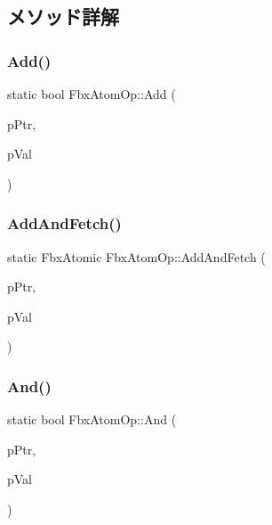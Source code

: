 \subsection{メソッド詳解}
\mbox{\label{class_fbx_atom_op_aa542a502e1881026c6936deb39c9641e}} 
\subsubsection{\texorpdfstring{Add()}{Add()}}
{\footnotesize\ttfamily static bool Fbx\+Atom\+Op\+::\+Add (\begin{DoxyParamCaption}\item[{volatile Fbx\+Atomic $\ast$}]{p\+Ptr,  }\item[{Fbx\+Atomic}]{p\+Val }\end{DoxyParamCaption})\hspace{0.3cm}{\ttfamily [static]}}

\mbox{\label{class_fbx_atom_op_a2eca6078f6e7257334866f900fd32f34}} 
\subsubsection{\texorpdfstring{Add\+And\+Fetch()}{AddAndFetch()}}
{\footnotesize\ttfamily static Fbx\+Atomic Fbx\+Atom\+Op\+::\+Add\+And\+Fetch (\begin{DoxyParamCaption}\item[{volatile Fbx\+Atomic $\ast$}]{p\+Ptr,  }\item[{Fbx\+Atomic}]{p\+Val }\end{DoxyParamCaption})\hspace{0.3cm}{\ttfamily [static]}}

\mbox{\label{class_fbx_atom_op_a76ab2e12877aae1b3f5a9625a04e1aac}} 
\subsubsection{\texorpdfstring{And()}{And()}}
{\footnotesize\ttfamily static bool Fbx\+Atom\+Op\+::\+And (\begin{DoxyParamCaption}\item[{volatile Fbx\+Atomic $\ast$}]{p\+Ptr,  }\item[{Fbx\+Atomic}]{p\+Val }\end{DoxyParamCaption})\hspace{0.3cm}{\ttfamily [static]}}

